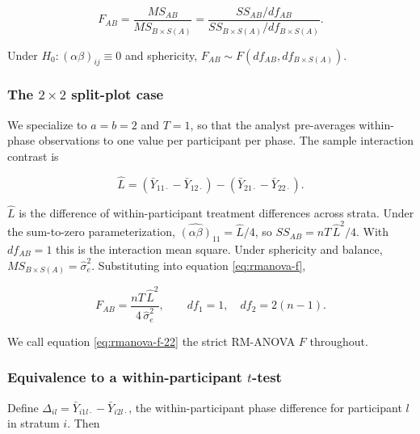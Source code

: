 \documentclass[
  11pt,
]{article}
\begin{document}
\begin{equation}
F_{AB} = \frac{MS_{AB}}{MS_{B \times S(A)}}
= \frac{SS_{AB} / df_{AB}}
       {SS_{B \times S(A)} / df_{B \times S(A)}} .
\label{eq:rmanova-f}
\end{equation}

Under \(H_0: (\alpha\beta)_{ij} \equiv 0\) and sphericity,
\(F_{AB} \sim F(df_{AB}, df_{B \times S(A)})\).

\subsubsection{\texorpdfstring{The \(2 \times 2\) split-plot case}{The 2 \textbackslash times 2 split-plot case}}\label{the-2-times-2-split-plot-case}

We specialize to \(a = b = 2\) and \(T = 1\), so that the analyst
pre-averages within-phase observations to one value per participant
per phase. The sample interaction contrast is

\begin{equation}
\hat L = (\bar Y_{11\cdot} - \bar Y_{12\cdot})
- (\bar Y_{21\cdot} - \bar Y_{22\cdot}) .
\label{eq:rmanova-Lhat}
\end{equation}

\(\hat L\) is the difference of within-participant treatment
differences across strata. Under the sum-to-zero parameterization,
\(\widehat{(\alpha\beta)}_{11} = \hat L / 4\), so \(SS_{AB} =
nT\,\hat L^2 / 4\). With \(df_{AB} = 1\) this is the interaction mean
square. Under sphericity and balance, \(MS_{B \times S(A)} =
\hat\sigma_e^2\). Substituting into equation \eqref{eq:rmanova-f},

\begin{equation}
F_{AB} = \frac{nT\,\hat L^2}{4\,\hat\sigma_e^2},
\qquad df_1 = 1, \quad df_2 = 2(n-1) .
\label{eq:rmanova-f-22}
\end{equation}

We call equation \eqref{eq:rmanova-f-22} the strict RM-ANOVA \(F\)
throughout.

\subsubsection{\texorpdfstring{Equivalence to a within-participant \(t\)-test}{Equivalence to a within-participant t-test}}\label{equivalence-to-a-within-participant-t-test}

Define \(\Delta_{il} = \bar Y_{i1l\cdot} - \bar Y_{i2l\cdot}\), the
within-participant phase difference for participant \(l\) in stratum
\(i\). Then
\end{document}
